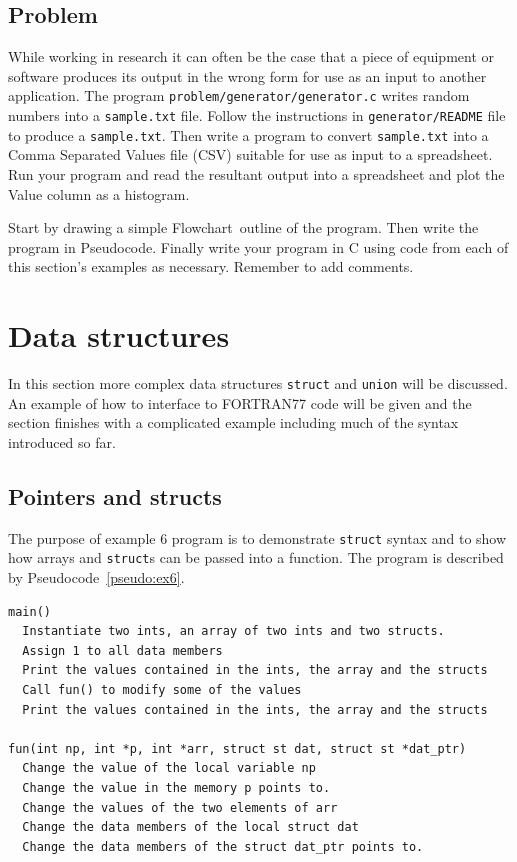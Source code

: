 \documentclass[11pt]{scrartcl}
\def\psc{Pseudocode}
\def\flo{Flowchart}
\begin{document}
\lstset{language=C}

\clearpage
\newpage

\subsection{Problem}

While working in research it can often be the case that a piece of
equipment or software produces its output in the wrong form for use as
an input to another application.  The program
\texttt{problem/generator/generator.c} writes random numbers into a
\texttt{sample.txt} file.  Follow the instructions in
\texttt{generator/README} file to produce a \texttt{sample.txt}.  Then write a
program to convert \texttt{sample.txt} into a Comma Separated Values file (CSV)\cite{csv} suitable for use as input to a spreadsheet.  Run your program and read the resultant output into a spreadsheet and plot the Value column as a histogram.

Start by drawing a simple \flo\ outline of the program.  Then write the program in \psc.  Finally write your program in C using code from each of this section's examples as necessary.  Remember to add comments.

\clearpage
\newpage


\section{Data structures}
In this section more complex data structures \texttt{struct} and \texttt{union} will
be discussed.  An example of how to interface to FORTRAN77 code will
be given and the section finishes with a complicated example including
much of the syntax introduced so far.

\subsection{Pointers and structs}

The purpose of example 6 program is to demonstrate \texttt{struct} syntax
and to show how arrays and \texttt{struct}s can be passed into a
function.  The program is described by \psc~\ref{pseudo:ex6}.

\begin{pseudocode}[h]
\begin{verbatim}
main()
  Instantiate two ints, an array of two ints and two structs.
  Assign 1 to all data members
  Print the values contained in the ints, the array and the structs
  Call fun() to modify some of the values
  Print the values contained in the ints, the array and the structs

fun(int np, int *p, int *arr, struct st dat, struct st *dat_ptr)
  Change the value of the local variable np
  Change the value in the memory p points to.
  Change the values of the two elements of arr
  Change the data members of the local struct dat
  Change the data members of the struct dat_ptr points to.
\end{verbatim}
\caption{Example 6 in pseudocode \label{pseudo:ex6}}
\end{pseudocode}
\end{document}
